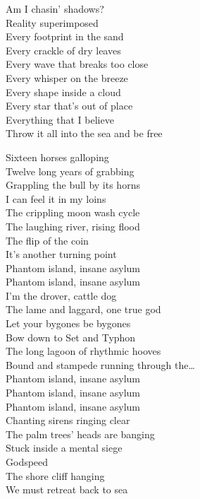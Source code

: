 
Am I chasin' shadows?\\
Reality superimposed\\
Every footprint in the sand\\
Every crackle of dry leaves\\
Every wave that breaks too close\\
Every whisper on the breeze\\
Every shape inside a cloud\\
Every star that's out of place\\
Everything that I believe\\
Throw it all into the sea and be free\\


Sixteen horses galloping\\
Twelve long years of grabbing\\
Grappling the bull by its horns\\
I can feel it in my loins\\
The crippling moon wash cycle\\
The laughing river, rising flood\\
The flip of the coin\\
It's another turning point\\

Phantom island, insane asylum\\
Phantom island, insane asylum\\
I'm the drover, cattle dog\\
The lame and laggard, one true god\\

Let your bygones be bygones\\
Bow down to Set and Typhon\\
The long lagoon of rhythmic hooves\\
Bound and stampede running through the…\\

Phantom island, insane asylum\\
Phantom island, insane asylum\\
Phantom island, insane asylum\\
Chanting sirens ringing clear\\

The palm trees' heads are banging\\
Stuck inside a mental siege\\
Godspeed\\
The shore cliff hanging\\
We must retreat back to sea\\


